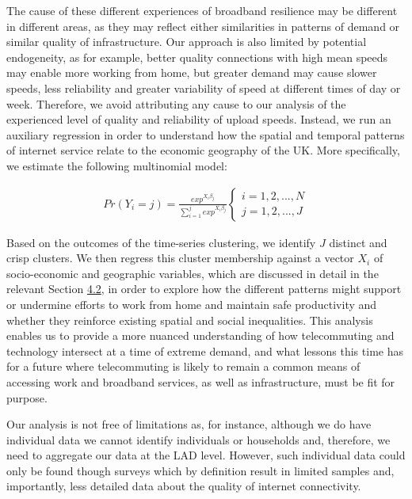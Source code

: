 \documentclass[Royal,times,sageh]{sagej}
\begin{document}
The cause of these different experiences of broadband resilience may be
different in different areas, as they may reflect either similarities in
patterns of demand or similar quality of infrastructure. Our approach is
also limited by potential endogeneity, as for example, better quality
connections with high mean speeds may enable more working from home, but
greater demand may cause slower speeds, less reliability and greater
variability of speed at different times of day or week. Therefore, we
avoid attributing any cause to our analysis of the experienced level of
quality and reliability of upload speeds. Instead, we run an auxiliary
regression in order to understand how the spatial and temporal patterns
of internet service relate to the economic geography of the UK. More
specifically, we estimate the following multinomial model:

\begin{align}
Pr(Y_{i}=j) = \frac{exp^{X_{i}\beta_{j}}}{\sum_{i=1}^j exp^{X_{i}\beta_{j}}}
\begin{cases}
    i = 1, 2, ... , N \\  
    j = 1, 2, ... , J
\end{cases}\label{eq1}
\end{align}

Based on the outcomes of the time-series clustering, we identify \(J\)
distinct and crisp clusters. We then regress this cluster membership
against a vector \(X_{i}\) of socio-economic and geographic variables,
which are discussed in detail in the relevant Section
\protect\hyperlink{sec:4.2}{4.2}, in order to explore how the different
patterns might support or undermine efforts to work from home and
maintain safe productivity and whether they reinforce existing spatial
and social inequalities. This analysis enables us to provide a more
nuanced understanding of how telecommuting and technology intersect at a
time of extreme demand, and what lessons this time has for a future
where telecommuting is likely to remain a common means of accessing work
and broadband services, as well as infrastructure, must be fit for
purpose.

Our analysis is not free of limitations as, for instance, although we do
have individual data we cannot identify individuals or households and,
therefore, we need to aggregate our data at the LAD level. However, such
individual data could only be found though surveys which by definition
result in limited samples and, importantly, less detailed data about the
quality of internet connectivity.
\end{document}

